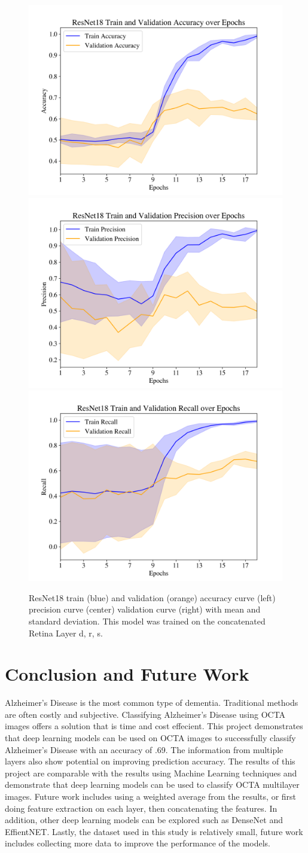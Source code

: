 \documentclass{article} %
\begin{document}
\begin{figure}[h]
\begin{center}
\label{fig:resnet18-3layer}
\includegraphics[width=.30\linewidth]{../3d/plots/resnet18/accuracy.png}
\includegraphics[width=.30\linewidth]{../3d/plots/resnet18/precision_score.png}
\includegraphics[width=.30\linewidth]{../3d/plots/resnet18/recall_score.png}
\end{center}
\caption{ResNet18 train (blue) and validation (orange) accuracy curve (left) precision curve (center) validation curve (right) with mean and standard deviation. This model was trained on the concatenated Retina Layer d, r, s.}
\end{figure}



\section{Conclusion and Future Work}
Alzheimer's Disease is the most common type of dementia. Traditional methods are often costly and subjective. Classifying Alzheimer's Disease using OCTA images offers a solution that is time and cost effecient. This project demonstrates that deep learning models can be used on OCTA images to successfully classify Alzheimer's Disease with an accuracy of .69. The information from multiple layers also show potential on improving prediction accuracy. The results of this project are comparable with the results using Machine Learning techniques and demonstrate that deep learning models can be used to classify OCTA multilayer images.  Future work includes using a weighted average from the results, or first doing feature extraction on each layer, then concatenating the features. In addition, other deep learning models can be explored such as DenseNet and EffientNET. Lastly, the dataset used in this study is relatively small, future work includes collecting more data to improve the performance of the models.
\end{document}
